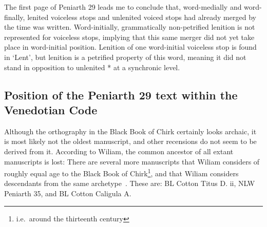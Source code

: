 The first page of Peniarth 29 leads me to conclude that, word-medially and word-finally, lenited voiceless stops and unlenited voiced stops had already merged by the time  was written. Word-initially, grammatically non-petrified lenition is not represented for voiceless stops, implying that this same merger did not yet take place in word-initial position. Lenition of one word-initial voiceless stop is found in  `Lent', but lenition is a petrified property of this word, meaning it did not stand in opposition to unlenited * at a synchronic level.

\subsection{Position of the Peniarth 29 text within the Venedotian Code}

Although the orthography in the Black Book of Chirk certainly looks archaic, it is most likely not the oldest manuscript, and other recensions do not seem to be derived from it. According to Wiliam, the common ancestor of all extant manuscripts is lost: 
There are several more manuscripts that Wiliam considers of roughly equal age to the Black Book of Chirk\footnote{i.e.\ around the thirteenth century}, and that Wiliam considers descendants from the same archetype~\parencite[xxix]{wiliam_llyfr_1960}. These are: BL Cotton Titus D. ii, NLW Peniarth 35, and BL Cotton Caligula A.

